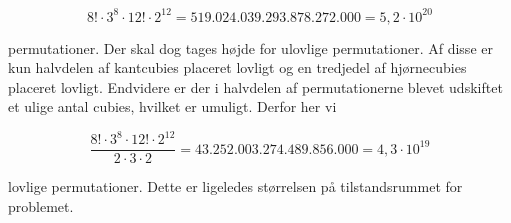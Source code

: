 \documentclass[../main.tex]{subfiles}
\begin{document}
$$8!\cdot3^8\cdot12!\cdot2^{12}=519.024.039.293.878.272.000=5,2\cdot10^{20}$$

permutationer. Der skal dog tages højde for ulovlige permutationer. Af disse er kun halvdelen af kantcubies placeret lovligt og en tredjedel af hjørnecubies placeret lovligt. Endvidere er der i halvdelen af permutationerne blevet udskiftet et ulige antal cubies, hvilket er umuligt. Derfor her vi

$$\frac{8!\cdot3^8\cdot12!\cdot2^{12}}{2\cdot3\cdot2}=43.252.003.274.489.856.000=4,3\cdot10^{19}$$

lovlige permutationer. Dette er ligeledes størrelsen på tilstandsrummet for problemet. 
\end{document}
